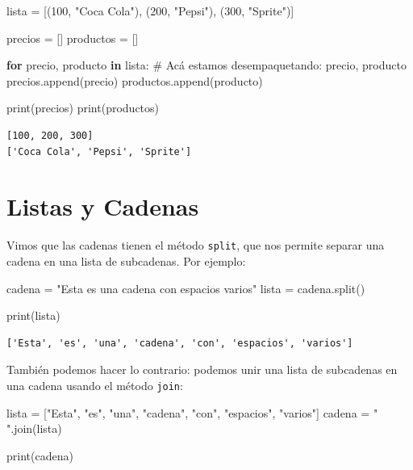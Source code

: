 \documentclass[
  letterpaper,
  DIV=11,
  numbers=noendperiod]{scrreprt}
\newenvironment{Shaded}{\begin{snugshade}}{\end{snugshade}}
\newcommand{\BuiltInTok}[1]{\textcolor[rgb]{0.00,0.23,0.31}{#1}}
\newcommand{\CommentTok}[1]{\textcolor[rgb]{0.37,0.37,0.37}{#1}}
\newcommand{\ControlFlowTok}[1]{\textcolor[rgb]{0.00,0.23,0.31}{\textbf{#1}}}
\newcommand{\DecValTok}[1]{\textcolor[rgb]{0.68,0.00,0.00}{#1}}
\newcommand{\KeywordTok}[1]{\textcolor[rgb]{0.00,0.23,0.31}{\textbf{#1}}}
\newcommand{\NormalTok}[1]{\textcolor[rgb]{0.00,0.23,0.31}{#1}}
\newcommand{\OperatorTok}[1]{\textcolor[rgb]{0.37,0.37,0.37}{#1}}
\newcommand{\StringTok}[1]{\textcolor[rgb]{0.13,0.47,0.30}{#1}}
\begin{document}
\begin{Shaded}
\begin{Highlighting}[]
\NormalTok{lista }\OperatorTok{=}\NormalTok{ [(}\DecValTok{100}\NormalTok{, }\StringTok{"Coca Cola"}\NormalTok{), (}\DecValTok{200}\NormalTok{, }\StringTok{"Pepsi"}\NormalTok{), (}\DecValTok{300}\NormalTok{, }\StringTok{"Sprite"}\NormalTok{)]}

\NormalTok{precios }\OperatorTok{=}\NormalTok{ []}
\NormalTok{productos }\OperatorTok{=}\NormalTok{ []}

\ControlFlowTok{for}\NormalTok{ precio, producto }\KeywordTok{in}\NormalTok{ lista: }\CommentTok{\# Acá estamos desempaquetando: precio, producto}
\NormalTok{    precios.append(precio)}
\NormalTok{    productos.append(producto)}

\BuiltInTok{print}\NormalTok{(precios)}
\BuiltInTok{print}\NormalTok{(productos)}
\end{Highlighting}
\end{Shaded}

\begin{verbatim}
[100, 200, 300]
['Coca Cola', 'Pepsi', 'Sprite']
\end{verbatim}

\section{Listas y Cadenas}\label{listas-y-cadenas}

Vimos que las cadenas tienen el método \texttt{split}, que nos permite
separar una cadena en una lista de subcadenas. Por ejemplo:

\begin{Shaded}
\begin{Highlighting}[]
\NormalTok{cadena }\OperatorTok{=} \StringTok{"Esta es una      cadena con    espacios   varios"}
\NormalTok{lista }\OperatorTok{=}\NormalTok{ cadena.split()}

\BuiltInTok{print}\NormalTok{(lista)}
\end{Highlighting}
\end{Shaded}

\begin{verbatim}
['Esta', 'es', 'una', 'cadena', 'con', 'espacios', 'varios']
\end{verbatim}

También podemos hacer lo contrario: podemos unir una lista de subcadenas
en una cadena usando el método \texttt{join}:

\begin{Shaded}
\begin{Highlighting}[]
\NormalTok{lista }\OperatorTok{=}\NormalTok{ [}\StringTok{"Esta"}\NormalTok{, }\StringTok{"es"}\NormalTok{, }\StringTok{"una"}\NormalTok{, }\StringTok{"cadena"}\NormalTok{, }\StringTok{"con"}\NormalTok{, }\StringTok{"espacios"}\NormalTok{, }\StringTok{"varios"}\NormalTok{]}
\NormalTok{cadena }\OperatorTok{=} \StringTok{" "}\NormalTok{.join(lista)}

\BuiltInTok{print}\NormalTok{(cadena)}
\end{Highlighting}
\end{Shaded}
\end{document}
